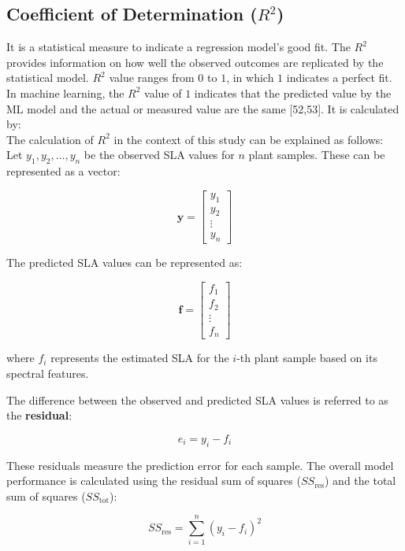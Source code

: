 \documentclass[12pt,a4paper]{report}
\begin{document}
\subsection*{Coefficient of Determination ($R^2$)}
It is a statistical measure to indicate a regression model's good fit. The $R^2$ provides information on how well the observed outcomes are replicated by the statistical model. $R^2$ value ranges from $0$ to $1$, in which $1$ indicates a perfect fit. In machine learning, the $R^2$ value of $1$ indicates that the predicted value by the ML model and the actual or measured value are the same [52,53]. It is calculated by: \\

The calculation of $R^2$ in the context of this study can be explained as follows: \\

Let \( y_1, y_2, \dots, y_n \) be the observed SLA values for \( n \) plant samples. These can be represented as a vector:

\[
\mathbf{y} = \begin{bmatrix} y_1 \\ y_2 \\ \vdots \\ y_n \end{bmatrix}
\]

The predicted SLA values can be represented as:

\[
\mathbf{f} = \begin{bmatrix} f_1 \\ f_2 \\ \vdots \\ f_n \end{bmatrix}
\]

where \( f_i \) represents the estimated SLA for the \( i \)-th plant sample based on its spectral features.


The difference between the observed and predicted SLA values is referred to as the \textbf{residual}:

\begin{equation}
   e_i = y_i - f_i 
\end{equation}



These residuals measure the prediction error for each sample. The overall model performance is calculated using the residual sum of squares (\( SS_{\text{res}} \)) and the total sum of squares (\( SS_{\text{tot}} \)):

\begin{equation}
   SS_{\text{res}} = \sum_{i=1}^{n} (y_i - f_i)^2 
\end{equation}
\end{document}
